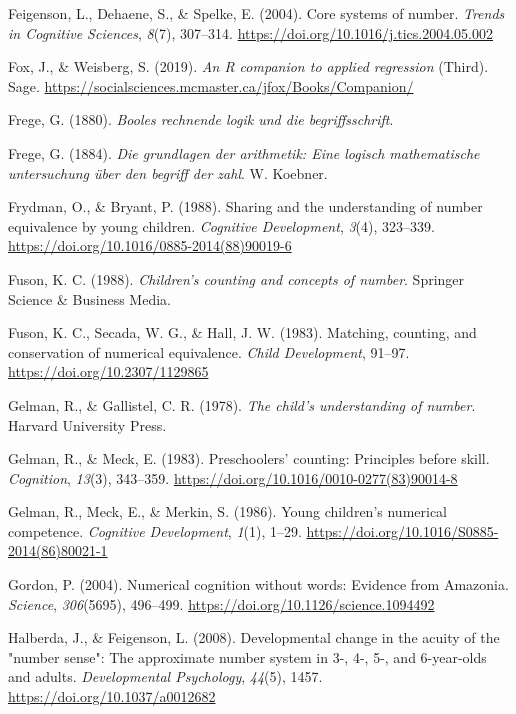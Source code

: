 \documentclass[
  man,floatsintext]{apa7}
\newlength{\cslhangindent}
\newenvironment{CSLReferences}[2] %
 {\begin{list}{}{%
  \setlength{\itemindent}{0pt}
  \setlength{\leftmargin}{0pt}
  \setlength{\parsep}{0pt}
  \ifodd #1
   \setlength{\leftmargin}{\cslhangindent}
   \setlength{\itemindent}{-1\cslhangindent}
  \fi
  \setlength{\itemsep}{#2\baselineskip}}}
 {\end{list}}
\begin{document}
\begin{CSLReferences}{1}{0}
Feigenson, L., Dehaene, S., \& Spelke, E. (2004). Core systems of number. \emph{Trends in Cognitive Sciences}, \emph{8}(7), 307--314. \url{https://doi.org/10.1016/j.tics.2004.05.002}

Fox, J., \& Weisberg, S. (2019). \emph{An {R} companion to applied regression} (Third). Sage. \url{https://socialsciences.mcmaster.ca/jfox/Books/Companion/}

Frege, G. (1880). \emph{Booles rechnende logik und die begriffsschrift}.

Frege, G. (1884). \emph{Die grundlagen der arithmetik: Eine logisch mathematische untersuchung über den begriff der zahl}. W. Koebner.

Frydman, O., \& Bryant, P. (1988). Sharing and the understanding of number equivalence by young children. \emph{Cognitive Development}, \emph{3}(4), 323--339. \url{https://doi.org/10.1016/0885-2014(88)90019-6}

Fuson, K. C. (1988). \emph{Children's counting and concepts of number}. Springer Science \& Business Media.

Fuson, K. C., Secada, W. G., \& Hall, J. W. (1983). Matching, counting, and conservation of numerical equivalence. \emph{Child Development}, 91--97. \url{https://doi.org/10.2307/1129865}

Gelman, R., \& Gallistel, C. R. (1978). \emph{The child's understanding of number}. Harvard University Press.

Gelman, R., \& Meck, E. (1983). Preschoolers' counting: Principles before skill. \emph{Cognition}, \emph{13}(3), 343--359. \url{https://doi.org/10.1016/0010-0277(83)90014-8}

Gelman, R., Meck, E., \& Merkin, S. (1986). Young children's numerical competence. \emph{Cognitive Development}, \emph{1}(1), 1--29. \url{https://doi.org/10.1016/S0885-2014(86)80021-1}

Gordon, P. (2004). Numerical cognition without words: Evidence from {Amazonia}. \emph{Science}, \emph{306}(5695), 496--499. \url{https://doi.org/10.1126/science.1094492}

Halberda, J., \& Feigenson, L. (2008). Developmental change in the acuity of the "number sense": The approximate number system in 3-, 4-, 5-, and 6-year-olds and adults. \emph{Developmental Psychology}, \emph{44}(5), 1457. \url{https://doi.org/10.1037/a0012682}


\end{CSLReferences}
\end{document}

